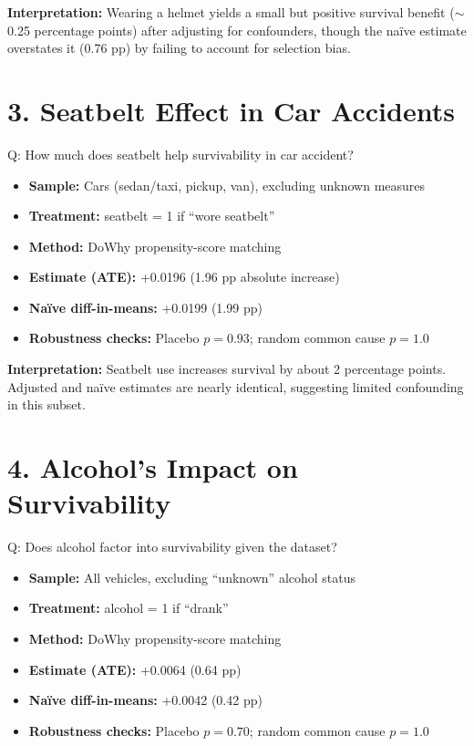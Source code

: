 \documentclass[a4paper]{article}
\begin{document}
\textbf{Interpretation:} Wearing a helmet yields a small but positive survival benefit ($\sim$0.25 percentage points) after adjusting for confounders, though the naïve estimate overstates it (0.76 pp) by failing to account for selection bias.

\section*{3. Seatbelt Effect in Car Accidents}
Q: How much does seatbelt help survivability in car accident?

\begin{itemize}
    \item \textbf{Sample:} Cars (sedan/taxi, pickup, van), excluding unknown measures
    \item \textbf{Treatment:} seatbelt = 1 if ``wore seatbelt''
    \item \textbf{Method:} DoWhy propensity-score matching
    \item \textbf{Estimate (ATE):} +0.0196 (1.96 pp absolute increase)
    \item \textbf{Naïve diff-in-means:} +0.0199 (1.99 pp)
    \item \textbf{Robustness checks:} Placebo $p = 0.93$; random common cause $p = 1.0$
\end{itemize}

\textbf{Interpretation:} Seatbelt use increases survival by about 2 percentage points. Adjusted and naïve estimates are nearly identical, suggesting limited confounding in this subset.

\section*{4. Alcohol's Impact on Survivability}
Q: Does alcohol factor into survivability given the dataset?

\begin{itemize}
    \item \textbf{Sample:} All vehicles, excluding ``unknown'' alcohol status
    \item \textbf{Treatment:} alcohol = 1 if ``drank''
    \item \textbf{Method:} DoWhy propensity-score matching
    \item \textbf{Estimate (ATE):} +0.0064 (0.64 pp)
    \item \textbf{Naïve diff-in-means:} +0.0042 (0.42 pp)
    \item \textbf{Robustness checks:} Placebo $p = 0.70$; random common cause $p = 1.0$
\end{itemize}
\end{document}
